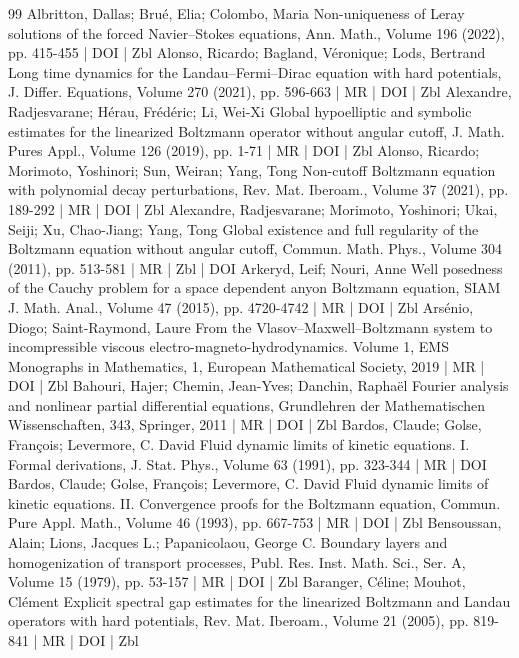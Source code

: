 \begin{thebibliography}{99}
 Albritton, Dallas; Brué, Elia; Colombo, Maria Non-uniqueness of Leray solutions of the forced Navier–Stokes equations, Ann. Math., Volume 196 (2022), pp. 415-455 | DOI | Zbl
 Alonso, Ricardo; Bagland, Véronique; Lods, Bertrand Long time dynamics for the Landau–Fermi–Dirac equation with hard potentials, J. Differ. Equations, Volume 270 (2021), pp. 596-663 | MR | DOI | Zbl
 Alexandre, Radjesvarane; Hérau, Frédéric; Li, Wei-Xi Global hypoelliptic and symbolic estimates for the linearized Boltzmann operator without angular cutoff, J. Math. Pures Appl., Volume 126 (2019), pp. 1-71 | MR | DOI | Zbl
 Alonso, Ricardo; Morimoto, Yoshinori; Sun, Weiran; Yang, Tong Non-cutoff Boltzmann equation with polynomial decay perturbations, Rev. Mat. Iberoam., Volume 37 (2021), pp. 189-292 | MR | DOI | Zbl
 Alexandre, Radjesvarane; Morimoto, Yoshinori; Ukai, Seiji; Xu, Chao-Jiang; Yang, Tong Global existence and full regularity of the Boltzmann equation without angular cutoff, Commun. Math. Phys., Volume 304 (2011), pp. 513-581 | MR | Zbl | DOI
 Arkeryd, Leif; Nouri, Anne Well posedness of the Cauchy problem for a space dependent anyon Boltzmann equation, SIAM J. Math. Anal., Volume 47 (2015), pp. 4720-4742 | MR | DOI | Zbl
 Arsénio, Diogo; Saint-Raymond, Laure From the Vlasov–Maxwell–Boltzmann system to incompressible viscous electro-magneto-hydrodynamics. Volume 1, EMS Monographs in Mathematics, 1, European Mathematical Society, 2019 | MR | DOI | Zbl
 Bahouri, Hajer; Chemin, Jean-Yves; Danchin, Raphaël Fourier analysis and nonlinear partial differential equations, Grundlehren der Mathematischen Wissenschaften, 343, Springer, 2011 | MR | DOI | Zbl
 Bardos, Claude; Golse, François; Levermore, C. David Fluid dynamic limits of kinetic equations. I. Formal derivations, J. Stat. Phys., Volume 63 (1991), pp. 323-344 | MR | DOI
 Bardos, Claude; Golse, François; Levermore, C. David Fluid dynamic limits of kinetic equations. II. Convergence proofs for the Boltzmann equation, Commun. Pure Appl. Math., Volume 46 (1993), pp. 667-753 | MR | DOI | Zbl
 Bensoussan, Alain; Lions, Jacques L.; Papanicolaou, George C. Boundary layers and homogenization of transport processes, Publ. Res. Inst. Math. Sci., Ser. A, Volume 15 (1979), pp. 53-157 | MR | DOI | Zbl
 Baranger, Céline; Mouhot, Clément Explicit spectral gap estimates for the linearized Boltzmann and Landau operators with hard potentials, Rev. Mat. Iberoam., Volume 21 (2005), pp. 819-841 | MR | DOI | Zbl

\end{thebibliography}
